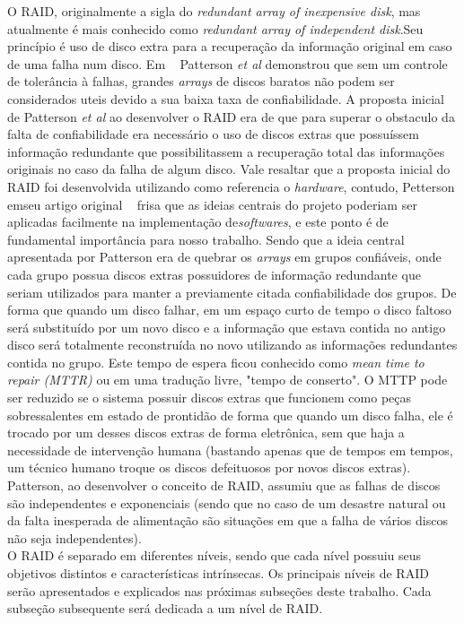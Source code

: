 		O RAID, originalmente a sigla do \textit{redundant array of inexpensive disk}, mas atualmente é mais conhecido como \textit{redundant array of independent disk}.Seu princípio é uso de disco extra para a recuperação da informação original em caso de uma falha num disco. Em ~\cite{patterson88} Patterson \textit{et al} demonstrou que sem um controle de tolerância à falhas, grandes \textit{arrays} de discos baratos não podem ser considerados uteis devido a sua baixa taxa de confiabilidade. A proposta inicial de Patterson \textit{et al} ao desenvolver o RAID era de que para superar o obstaculo da falta de confiabilidade era necessário o uso de discos extras que possuíssem informação redundante que possibilitassem a recuperação total das informações originais no caso da falha de algum disco. Vale resaltar que a proposta inicial do RAID foi desenvolvida utilizando como referencia o \textit{hardware}, contudo, Petterson emseu artigo original ~\cite{patterson88} frisa que as ideias centrais do projeto poderiam ser aplicadas facilmente na implementação de\textit{softwares}, e este ponto é de fundamental importância para nosso trabalho. Sendo que a ideia central apresentada por Patterson era de quebrar os \textit{arrays} em grupos confiáveis, onde cada grupo possua discos extras possuidores de informação redundante que seriam utilizados para manter a previamente citada confiabilidade dos grupos. De forma que quando um disco falhar, em um espaço curto de tempo o disco faltoso será substituído por um novo disco e a informação que estava contida no antigo disco será totalmente reconstruída no novo utilizando as informações redundantes contida no grupo. Este tempo de espera ficou conhecido como \textit{mean time to repair (MTTR)} ou em uma tradução livre, "tempo de conserto". O MTTP pode ser reduzido se o sistema possuir discos extras que funcionem como peças sobressalentes em estado de prontidão de forma que quando um disco falha, ele é trocado por um desses discos extras de forma eletrônica, sem que haja a necessidade de intervenção humana (bastando apenas que de tempos em tempos, um técnico humano troque os discos defeituosos por novos discos extras). Patterson, ao desenvolver o conceito de RAID, assumiu que as falhas de discos são independentes e exponenciais (sendo que no caso de um desastre natural ou da falta inesperada de alimentação são situações em que a falha de vários discos não seja independentes). \\
		
		O RAID é separado em diferentes níveis, sendo que cada nível possuiu seus objetivos distintos e características intrínsecas. Os principais níveis de RAID serão apresentados e explicados nas próximas subseções deste trabalho. Cada subseção subsequente será dedicada a um nível de RAID.\\
		
